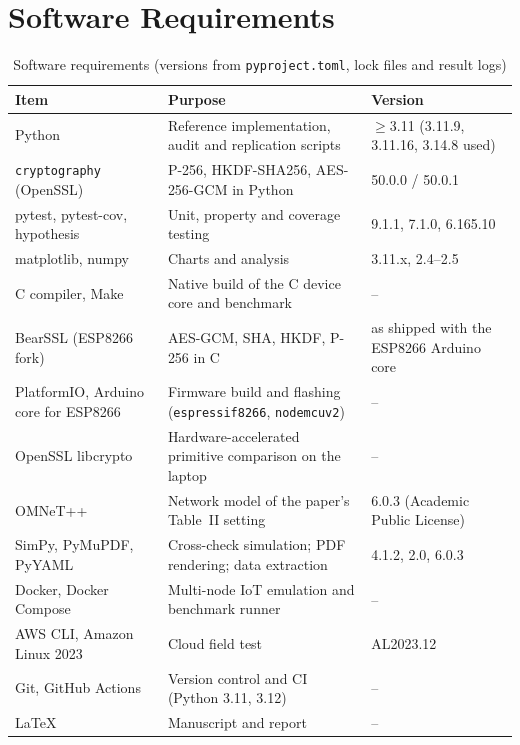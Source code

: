 \documentclass[12pt,a4paper,oneside]{report}
\numberwithin{equation}{chapter}
\begin{document}
\section{Software Requirements}
\begin{table}[H]
\centering
\caption[Software requirements]{Software requirements (versions from \texttt{pyproject.toml}, lock files and result logs)}
\label{tab:sw}
\small
\begin{tabularx}{\textwidth}{|P{0.25\textwidth}|Y|P{0.22\textwidth}|}
\hline
\textbf{Item} & \textbf{Purpose} & \textbf{Version}\\ \hline
Python & Reference implementation, audit and replication scripts & $\ge$3.11 (3.11.9, 3.11.16, 3.14.8 used)\\ \hline
\texttt{cryptography} (OpenSSL) & P-256, HKDF-SHA256, AES-256-GCM in Python & 50.0.0 / 50.0.1\\ \hline
pytest, pytest-cov, hypothesis & Unit, property and coverage testing & 9.1.1, 7.1.0, 6.165.10\\ \hline
matplotlib, numpy & Charts and analysis & 3.11.x, 2.4--2.5\\ \hline
C compiler, Make & Native build of the C device core and benchmark & --\\ \hline
BearSSL (ESP8266 fork) & AES-GCM, SHA, HKDF, P-256 in C & as shipped with the ESP8266 Arduino core\\ \hline
PlatformIO, Arduino core for ESP8266 & Firmware build and flashing (\texttt{espressif8266}, \texttt{nodemcuv2}) & --\\ \hline
OpenSSL libcrypto & Hardware-accelerated primitive comparison on the laptop & --\\ \hline
OMNeT++ & Network model of the paper's Table~II setting & 6.0.3 (Academic Public License)\\ \hline
SimPy, PyMuPDF, PyYAML & Cross-check simulation; PDF rendering; data extraction & 4.1.2, 2.0, 6.0.3\\ \hline
Docker, Docker Compose & Multi-node IoT emulation and benchmark runner & --\\ \hline
AWS CLI, Amazon Linux 2023 & Cloud field test & AL2023.12\\ \hline
Git, GitHub Actions & Version control and CI (Python 3.11, 3.12) & --\\ \hline
LaTeX & Manuscript and report & --\\ \hline
\end{tabularx}
\end{table}
\end{document}
